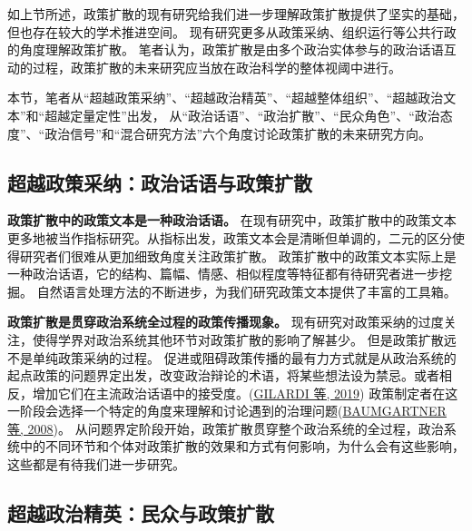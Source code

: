 \documentclass[
  12pt,
]{ctexart}
\begin{document}
如上节所述，政策扩散的现有研究给我们进一步理解政策扩散提供了坚实的基础，但也存在较大的学术推进空间。
现有研究更多从政策采纳、组织运行等公共行政的角度理解政策扩散。
笔者认为，政策扩散是由多个政治实体参与的政治话语互动的过程，政策扩散的未来研究应当放在政治科学的整体视阈中进行。

本节，笔者从``超越政策采纳''、``超越政治精英''、``超越整体组织''、``超越政治文本''和``超越定量定性''出发，
从``政治话语''、``政治扩散''、``民众角色''、``政治态度''、``政治信号''和``混合研究方法''六个角度讨论政策扩散的未来研究方向。

\hypertarget{ux8d85ux8d8aux653fux7b56ux91c7ux7eb3ux653fux6cbbux8bddux8bedux4e0eux653fux7b56ux6269ux6563}{%
\subsection{超越政策采纳：政治话语与政策扩散}\label{ux8d85ux8d8aux653fux7b56ux91c7ux7eb3ux653fux6cbbux8bddux8bedux4e0eux653fux7b56ux6269ux6563}}

\textbf{政策扩散中的政策文本是一种政治话语。}
在现有研究中，政策扩散中的政策文本更多地被当作指标研究。从指标出发，政策文本会是清晰但单调的，二元的区分使得研究者们很难从更加细致角度关注政策扩散。
政策扩散中的政策文本实际上是一种政治话语，它的结构、篇幅、情感、相似程度等特征都有待研究者进一步挖掘。
自然语言处理方法的不断进步，为我们研究政策文本提供了丰富的工具箱。

\textbf{政策扩散是贯穿政治系统全过程的政策传播现象。}
现有研究对政策采纳的过度关注，使得学界对政治系统其他环节对政策扩散的影响了解甚少。
但是政策扩散远不是单纯政策采纳的过程。
促进或阻碍政策传播的最有力方式就是从政治系统的起点政策的问题界定出发，改变政治辩论的术语，将某些想法设为禁忌。或者相反，增加它们在主流政治话语中的接受度。(\protect\hyperlink{ref-GilardiWasserfallen2019}{GILARDI 等, 2019})
政策制定者在这一阶段会选择一个特定的角度来理解和讨论遇到的治理问题(\protect\hyperlink{ref-BaumgartnerEtAl2008}{BAUMGARTNER 等, 2008})。
从问题界定阶段开始，政策扩散贯穿整个政治系统的全过程，政治系统中的不同环节和个体对政策扩散的效果和方式有何影响，为什么会有这些影响，这些都是有待我们进一步研究。

\hypertarget{ux8d85ux8d8aux653fux6cbbux7cbeux82f1ux6c11ux4f17ux4e0eux653fux7b56ux6269ux6563}{%
\subsection{超越政治精英：民众与政策扩散}\label{ux8d85ux8d8aux653fux6cbbux7cbeux82f1ux6c11ux4f17ux4e0eux653fux7b56ux6269ux6563}}
\end{document}
